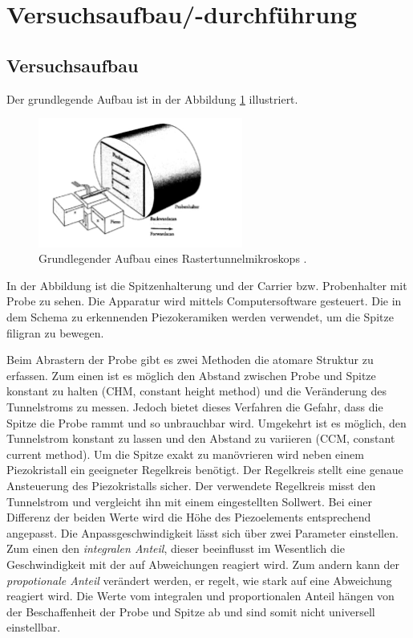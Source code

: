 \section{Versuchsaufbau/-durchführung}

\subsection{Versuchsaufbau}
Der grundlegende Aufbau ist in der Abbildung \ref{fig: aufbau} illustriert.
\begin{figure}[!h]
  \centering
  \includegraphics[width=0.6\textwidth]{./pics/aufbau.png}
  \caption{Grundlegender Aufbau eines Rastertunnelmikroskops \cite{anleitung_frankfurt}.}
  \label{fig: aufbau}
\end{figure}
In der Abbildung ist die Spitzenhalterung und
der Carrier bzw. Probenhalter mit Probe zu sehen. Die Apparatur wird mittels Computersoftware gesteuert.
Die in dem Schema zu erkennenden Piezokeramiken werden
verwendet, um die Spitze filigran zu bewegen. %

Beim Abrastern der Probe gibt es zwei Methoden die atomare Struktur zu erfassen.
Zum einen ist es möglich den Abstand zwischen Probe und Spitze konstant zu halten (CHM, constant height method)
und die Veränderung des Tunnelstroms zu messen. %
Jedoch bietet dieses Verfahren die Gefahr, dass die Spitze die Probe rammt und so unbrauchbar wird.
Umgekehrt ist es möglich, den Tunnelstrom konstant zu lassen und den Abstand zu variieren (CCM, constant current method).
Um die Spitze exakt zu manövrieren wird neben einem Piezokristall ein geeigneter Regelkreis benötigt. %
Der Regelkreis stellt eine genaue Ansteuerung des Piezokristalls sicher.
Der verwendete Regelkreis misst den Tunnelstrom und vergleicht ihn mit einem
eingestellten Sollwert. Bei einer Differenz der beiden Werte wird die Höhe des Piezoelements
entsprechend angepasst. Die Anpassgeschwindigkeit lässt sich über zwei Parameter
einstellen. Zum einen den \emph{integralen Anteil}, dieser beeinflusst im Wesentlich die %
Geschwindigkeit mit der auf Abweichungen reagiert wird. Zum andern kann der %
\emph{propotionale Anteil} verändert werden,
er regelt, wie stark auf eine Abweichung reagiert wird.
Die Werte vom integralen und proportionalen Anteil hängen von der Beschaffenheit
der Probe und Spitze ab \cite{anleitung_frankfurt} und sind somit nicht universell einstellbar.

